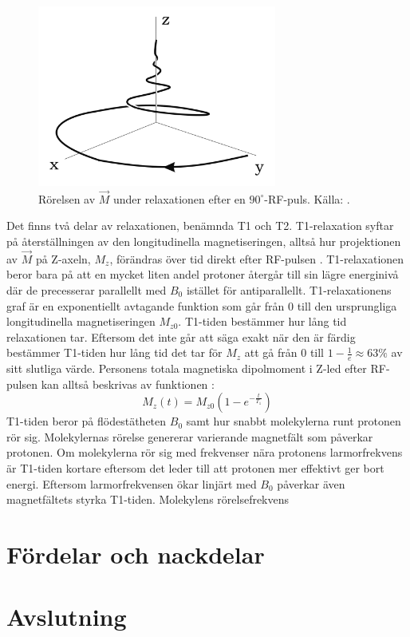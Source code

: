 \documentclass[11pt, a4paper]{article}
\begin{document}
\begin{figure}[ht]
	\centering
	\includegraphics[width=0.7\textwidth]{relaxation}
	\caption{Rörelsen av $\vec{M}$ under relaxationen efter en $90^\circ$-RF-puls. Källa: \cite{mri_lärobok}.}
	\label{fig:relaxation}
\end{figure}

Det finns två delar av relaxationen, benämnda T1 och T2. T1-relaxation syftar på återställningen av den longitudinella magnetiseringen, alltså hur projektionen av $\vec{M}$ på Z-axeln, $M_z$, förändras över tid direkt efter RF-pulsen \parencite{understanding_mri}. T1-relaxationen beror bara på att en mycket liten andel protoner återgår till sin lägre energinivå där de precesserar parallellt med $B_0$ istället för antiparallellt. T1-relaxationens graf är en exponentiellt avtagande funktion som går från $0$ till den ursprungliga longitudinella magnetiseringen $M_{z0}$. T1-tiden bestämmer hur lång tid relaxationen tar. Eftersom det inte går att säga exakt när den är färdig bestämmer T1-tiden hur lång tid det tar för $M_z$ att gå från 0 till $1-\frac{1}{e}\approx63\%$ av sitt slutliga värde. Personens totala magnetiska dipolmoment i Z-led efter RF-pulsen kan alltså beskrivas av funktionen \parencite{t1_relaxation}: 
\begin{equation}
	M_z(t)=M_{z0}(1-e^{-\frac{t}{T_1}})	
\end{equation}
T1-tiden beror på flödestätheten $B_0$ samt hur snabbt molekylerna runt protonen rör sig. Molekylernas rörelse genererar varierande magnetfält som påverkar protonen. Om molekylerna rör sig med frekvenser nära protonens larmorfrekvens är T1-tiden kortare eftersom det leder till att protonen mer effektivt ger bort energi. Eftersom larmorfrekvensen ökar linjärt med $B_0$ påverkar även magnetfältets styrka T1-tiden. Molekylens rörelsefrekvens 

\clearpage
\section{Fördelar och nackdelar}


\clearpage
\section{Avslutning}

\clearpage
\printbibliography
\end{document}
